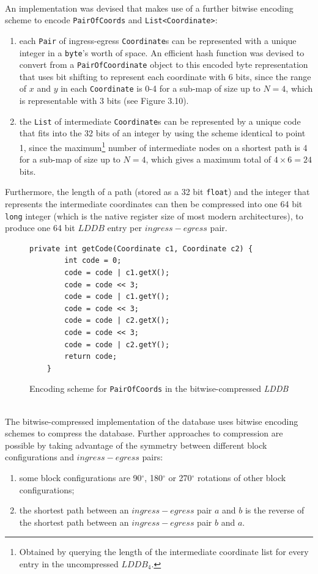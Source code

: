 \documentclass[12pt,notitlepage]{report}
\begin{document}
\\
\noindent
An implementation was devised that makes use of a further bitwise encoding scheme to encode {\tt PairOfCoords} and {\tt List<Coordinate>}:
\begin{enumerate}
\item each {\tt Pair} of ingress-egress {\tt Coordinate}s can be represented with a unique integer in a {\tt byte}'s worth of space. An efficient hash function was devised to convert from a {\tt PairOfCoordinate} object to this encoded byte representation that uses bit shifting to represent each coordinate with 6 bits, since the range of $x$ and $y$ in each {\tt Coordinate} is 0-4 for a sub-map of size up to {$N=4$}, which is representable with 3 bits (see Figure 3.10).
\item the {\tt List} of intermediate {\tt Coordinate}s can be represented by a unique code that fits into the 32 bits of an integer by using the scheme identical to point 1, since the maximum\footnote{Obtained by querying the length of the intermediate coordinate list for every entry in the uncompressed $LDDB_{4}$.} number of intermediate nodes on a shortest path is 4 for a sub-map of size up to {$N=4$}, which gives a maximum total of $4 \times 6 = 24$ bits. 
\end{enumerate}

\noindent
Furthermore, the length of a path (stored as a 32 bit {\tt float}) and the integer that represents the intermediate coordinates can then be compressed into one 64 bit {\tt long} integer (which is the native register size of most modern architectures), to produce one 64 bit $LDDB$ entry per $ingress-egress$ pair.\\

\begin{figure}
\begin{lstlisting}
private int getCode(Coordinate c1, Coordinate c2) {
		int code = 0;
		code = code | c1.getX();
		code = code << 3;
		code = code | c1.getY();
		code = code << 3;
		code = code | c2.getX();
		code = code << 3;
		code = code | c2.getY();
		return code;	
	}
\end{lstlisting}
\caption{Encoding scheme for {\tt PairOfCoords} in the bitwise-compressed {\em LDDB}}
\end{figure}

\\
\noindent
The bitwise-compressed implementation of the database uses bitwise encoding schemes to compress the database. Further approaches to compression are possible by taking advantage of the symmetry between different block configurations and $ingress-egress$ pairs:
\begin{enumerate}
\item some block configurations are 90$^{\circ}$,  180$^{\circ}$ or 270$^{\circ}$ rotations of other block configurations;
\item the shortest path between an $ingress-egress$ pair $a$ and $b$ is the reverse of the shortest path between an $ingress-egress$ pair $b$ and $a$. 
\end{enumerate}
\end{document}
